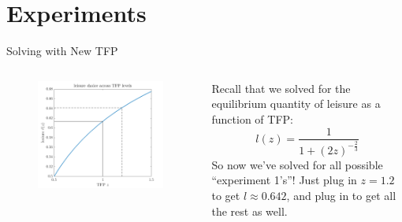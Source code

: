 \documentclass[11pt,aspectratio=169,usenames,dvipsnames]{beamer}
\begin{document}
\section{Experiments}
\label{sec:Experiments}

\begin{frame}{Solving with New TFP}
\label{slide:Solving_with_New_TFP}
    \begin{columns}
        \begin{column}{0.5\textwidth}
            \begin{figure}
                \includegraphics[width=\textwidth]{./figures/TFPsolveSPP.png}
            \end{figure}
        \end{column}
        \begin{column}{0.5\textwidth}
            Recall that we solved for the equilibrium quantity of leisure as a function of TFP:
            \begin{equation}
            \label{eq:leisure}
                l( z ) = \frac{1}{1 + ( 2z )^{-\frac{2}{3}}}
            \end{equation}
            So now we’ve solved for all possible ``experiment 1’s''! Just plug in $ z = 1.2 $ to get $ l \approx 0.642 $, and plug in to get all the rest as well.
        \end{column}
    \end{columns}
\end{frame}
\end{document}
